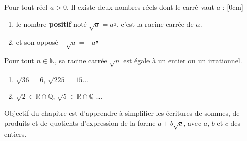 \documentclass[main.tex]{subfiles}
\begin{document}
\begin{definition} Pour tout réel $a>0$. Il existe deux nombres réels dont le carré vaut $a$ :
	[0cm]
	\begin{enumerate}[leftmargin=*,label=\textbullet]
		\item le nombre \textbf{positif} noté $\sqrt{a}=a^{\frac{1}{2}}$, c'est \og la racine carrée de $a$\fg.
		\item et son opposé $-\sqrt{a}=-a^{\frac{1}{2}}$
	\end{enumerate}
\end{definition}  
\begin{theorem} Pour tout $n\in\mathbb{N}$, sa racine carrée $\sqrt{n}$ est égale à un entier  ou un irrationnel.
\end{theorem}
\begin{example}\hfill 
	\begin{enumerate}[label=\alph*),leftmargin=*]
	 \item $\sqrt{36}=6$, $\sqrt{225}=15$...
	 \item $\sqrt{2}\in \mathbb{R}\cap \overline{\mathbb{Q}}$,  $\sqrt{5}\in \mathbb{R}\cap \overline{\mathbb{Q}}$ ...
	\end{enumerate} 
\end{example} 
\begin{remark} Objectif du chapitre est d'apprendre à simplifier les écritures de sommes, de produits et de quotients d'expression de la forme $a+b\sqrt{c}$, avec $a$, $b$ et $c$ des entiers. 
\end{remark}
%	 


\newpage 
{}  
\pagestyle{scrheadings} %
\onehalfspacing
\end{document}
